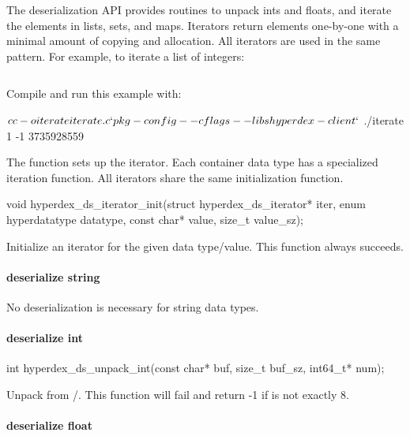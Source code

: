 The deserialization API provides routines to unpack ints and floats, and iterate
the elements in lists, sets, and maps.  Iterators return elements one-by-one
with a minimal amount of copying and allocation.  All iterators are used in the
same pattern.  For example, to iterate a list of integers:

\inputminted{c}{\topdir/api/c/iterate.c}

Compile and run this example with:

\begin{consolecode}
$ cc -o iterate iterate.c `pkg-config --cflags --libs hyperdex-client`
$ ./iterate
1
-1
3735928559
\end{consolecode}

The function  sets up the iterator.  Each
container data type has a specialized iteration function.  All iterators share
the same initialization function.

\begin{ccode}
void hyperdex_ds_iterator_init(struct hyperdex_ds_iterator* iter,
                               enum hyperdatatype datatype,
                               const char* value,
                               size_t value_sz);
\end{ccode}
\funcdesc Initialize an iterator for the given data type/value.  This function
always succeeds.

\paragraph{deserialize string}

No deserialization is necessary for string data types.

\paragraph{deserialize int}

\begin{ccode}
int hyperdex_ds_unpack_int(const char* buf, size_t buf_sz, int64_t* num);
\end{ccode}
\funcdesc Unpack  from /.  This function will
fail and return -1 if  is not exactly \unit{8}{\byte}.

\paragraph{deserialize float}

